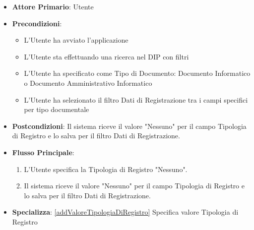 \begin{itemize}
      \item \textbf{Attore Primario}: Utente
      \item \textbf{Precondizioni}: 
      \begin{itemize}            
            \item L'Utente ha avviato l'applicazione
            \item L'Utente sta effettuando una ricerca nel DIP con filtri
            \item L'Utente ha specificato come Tipo di Documento: Documento Informatico o Documento Amministrativo Informatico
            \item L'Utente ha selezionato il filtro Dati di Registrazione tra i campi specifici per tipo documentale
      \end{itemize}
      \item \textbf{Postcondizioni}: Il sistema riceve il valore "Nessuno" per il campo Tipologia di Registro e lo salva per il filtro Dati di Registrazione.
      \item \textbf{Flusso Principale}:
      \begin{enumerate}
            \item L'Utente specifica la Tipologia di Registro "Nessuno".
            \item Il sistema riceve il valore "Nessuno" per il campo Tipologia di Registro e lo salva per il filtro Dati di Registrazione.
      \end{enumerate}
      \item \textbf{Specializza}: \ref{addValoreTipologiaDiRegistro} Specifica valore Tipologia di Registro
\end{itemize}

